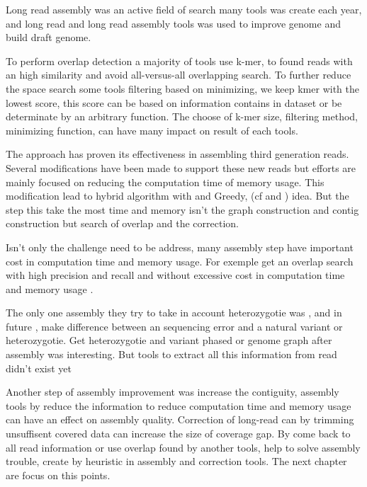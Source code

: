 \documentclass[main]{subfiles}
\begin{document}
Long read assembly was an active field of search many tools was create each year, and long read and long read assembly tools was used to improve genome and build draft genome.

To perform overlap detection a majority of tools use k-mer, to found reads with an high similarity and avoid all-versus-all overlapping search. To further reduce the space search some tools filtering based on minimizing, we keep kmer with the lowest score, this score can be based on information contains in dataset or be determinate by an arbitrary function. The choose of k-mer size, filtering method, minimizing function, can have many impact on result of each tools. 

The \OLC approach has proven its effectiveness in assembling third generation reads. Several modifications have been made to support these new reads but efforts are mainly focused on reducing the computation time of memory usage. This modification lead to hybrid \OLC algorithm with \DBG and Greedy, (cf \flye and \wtdbg) idea. But the step this take the most time and memory isn't the graph construction and contig construction but search of overlap and the correction.

Isn't only the challenge need to be address, many assembly step have important cost in computation time and memory usage. For exemple get an overlap search with high precision and recall and without excessive cost in computation time and memory usage \cite{bench_ovl}.

The only one assembly they try to take in account heterozygotie was , and in future \shasta, make difference between an sequencing error and a natural variant or heterozygotie. Get heterozygotie and variant phased or genome graph after assembly was interesting. But tools to extract all this information from read didn't exist yet

Another step of assembly improvement was increase the contiguity, assembly tools by reduce the information to reduce computation time and memory usage can have an effect on assembly quality. Correction of long-read can by trimming unsuffisent covered data can increase the size of coverage gap.
By come back to all read information or use overlap found by another tools, help to solve assembly trouble, create by heuristic in assembly and correction tools. The next chapter are focus on this points.


\end{document}
